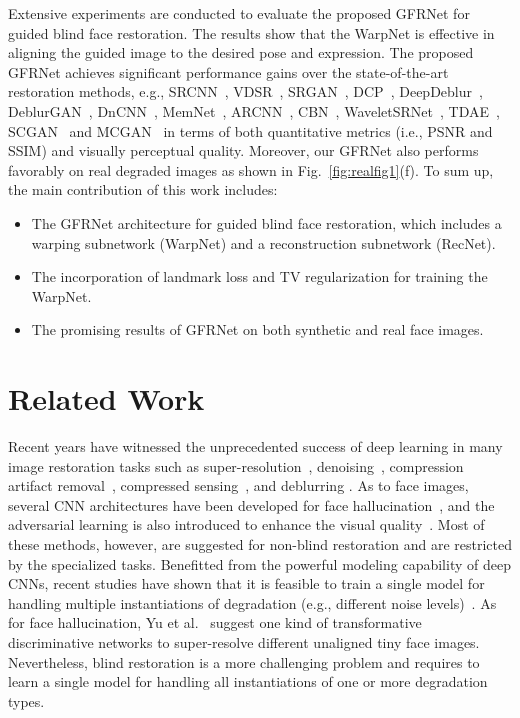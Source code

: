 \documentclass[runningheads]{llncs}
\begin{document}
Extensive experiments are conducted to evaluate the proposed GFRNet for guided blind face restoration.
The results show that the WarpNet is effective in aligning the guided image to the desired pose and expression.
The proposed GFRNet achieves significant performance gains over the state-of-the-art restoration methods, e.g., SRCNN~\cite{dong2014learning}, VDSR~\cite{kim2016accurate}, SRGAN~\cite{Ledig2017CVPR}, DCP~\cite{pan2016blind}, {DeepDeblur~\cite{Nah2017CVPR}, DeblurGAN~\cite{DeblurGAN}, DnCNN~\cite{zhang2017beyond}, MemNet~\cite{MemNet}, ARCNN~\cite{Dong2015ICCV}, CBN~\cite{zhu2016deep}, WaveletSRNet~\cite{huang2017wavelet}, TDAE~\cite{yu2017hallucinating},} SCGAN~\cite{xu2017learning} and MCGAN~\cite{xu2017learning} in terms of both quantitative metrics (i.e., PSNR and SSIM) and visually perceptual quality.
Moreover, our GFRNet also performs favorably on real degraded images as shown in Fig.~\ref{fig:realfig1}(f).
To sum up, the main contribution of this work includes:
\begin{itemize}
\item The GFRNet architecture for guided blind face restoration, which includes a warping subnetwork (WarpNet) and a reconstruction subnetwork (RecNet).
\item The incorporation of landmark loss and TV regularization for training the WarpNet.
\item The promising results of GFRNet on both synthetic and real face images.
\end{itemize}

\section{Related Work}\label{section2}
Recent years have witnessed the unprecedented success of deep learning in many image restoration tasks such as super-resolution~\cite{dong2014learning,kim2016accurate,Ledig2017CVPR}, {denoising~\cite{zhang2017beyond,MemNet}}, {compression artifact removal~\cite{Dong2015ICCV,Galteri2017ICCV}}, compressed sensing~\cite{kulkarni2016reconnet,jin2017deep,lucas2018using}, and {deblurring \cite{Nah2017CVPR,DeblurGAN,chakrabarti2016neural,nimisha2017blur}}.
As to face images, several CNN architectures have been developed for face hallucination~\cite{zhu2016deep,cao2017attention,chen2017fsrnet,huang2017wavelet}, and the adversarial learning is also introduced to enhance the visual quality~\cite{yu2016ultra,yu2017face}.
{Most of these methods}, however, are suggested for non-blind restoration and are restricted by the specialized tasks.
Benefitted from the powerful modeling capability of deep CNNs, recent studies have shown that it is feasible to train a single model for handling multiple instantiations of degradation (e.g., different noise levels)~\cite{zhang2017beyond,mao2016image}.
As for face hallucination, Yu et al.~\cite{yu2017face,yu2017hallucinating} suggest one kind of transformative discriminative networks to super-resolve different unaligned tiny face images.
Nevertheless, blind restoration is a more challenging problem and requires to learn a single model for handling all instantiations of one or more degradation types.
\end{document}
